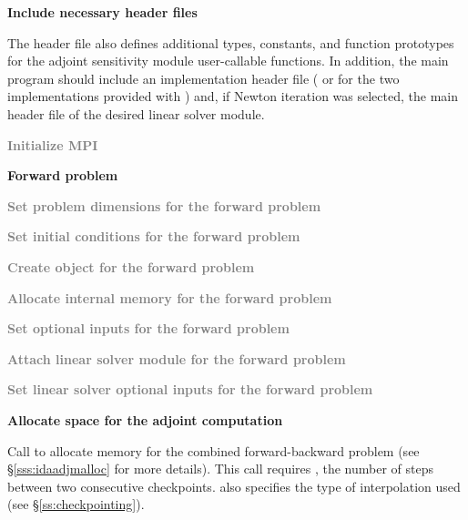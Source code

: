 \begin{Steps}

\item
  {\bf Include necessary header files}
  
  The  header file also defines additional types, constants, and
  function prototypes for the adjoint sensitivity module user-callable functions.
  In addition, the main program should include an {\nvector} 
  implementation header file ( or 
  for the two implementations provided with {\idas}) and, if Newton iteration 
  was selected, the main header file of the desired linear solver module.

\item
  \textcolor{gray}{\bf {\p} Initialize MPI}

  \vspace{0.2in}\centerline{\bf Forward problem}

\item
  \textcolor{gray}{\bf Set problem dimensions for the forward problem}

\item
  \textcolor{gray}{\bf Set initial conditions for the forward problem}

\item
  \textcolor{gray}{\bf Create {\idas} object for the forward problem}

\item
  \textcolor{gray}{\bf Allocate internal memory for the forward problem}

\item
  \textcolor{gray}{\bf Set optional inputs for the forward problem}

\item
  \textcolor{gray}{\bf Attach linear solver module for the forward problem}

\item
  \textcolor{gray}{\bf Set linear solver optional inputs for the forward problem}

\item
  {\bf Allocate space for the adjoint computation}

  Call \id{()} to allocate memory for the 
  combined forward-backward problem (see \S\ref{sss:idaadjmalloc} for more details).
  This call requires , the number of steps between two consecutive checkpoints.
   also specifies the type of interpolation used 
  (see \S\ref{ss:checkpointing}).


\end{Steps}
